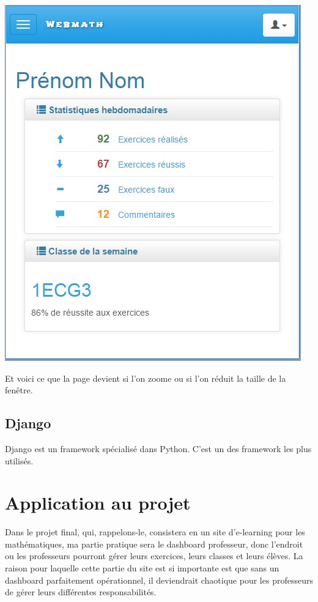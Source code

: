 \documentclass[letterpaper,10pt,french]{sphinxmanual}
\begin{document}
\includegraphics{source/images/smallscreen.png}

Et voici ce que la page devient si l'on zoome ou si l'on réduit la taille de la
fenêtre.


\subsection{Django}
\label{documentation:django}
Django est un framework spécialisé dans Python. C'est un des framework les plus
utilisés.


\section{Application au projet}
\label{documentation:application-au-projet}
Dans le projet final, qui, rappelons-le, consistera en un site d'e-learning pour
les mathématiques, ma partie pratique sera le dashboard professeur, donc
l'endroit ou les professeurs pourront gérer leurs exercices, leurs classes et
leurs élèves. La raison pour laquelle cette partie du site est si importante
est que sans un dashboard parfaitement opérationnel, il deviendrait chaotique
pour les professeurs de gérer leurs différentes responsabilités.
\end{document}
